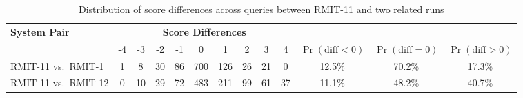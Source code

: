\begin{table*}[t]
  \centering
  \caption{Distribution of score differences across queries between RMIT-11 and two related runs}
  \label{tbl:scorediff}
  \begin{tabular}{lcccccccccccc}
    \toprule
    \bf System Pair & \multicolumn{9}{c}{\bf Score Differences} \\
    & -4 & -3 & -2 & -1 & 0 & 1 & 2 & 3 & 4 & $\Pr(\text{diff} < 0)$ & $\Pr(\text{diff} = 0)$ & $\Pr(\text{diff} > 0)$ \\
    \midrule
    RMIT-11 vs.\ RMIT-1  & 1 & 8 & 30 & 86 & 700 & 126 & 26 & 21 & 0 & 12.5\% & 70.2\% & 17.3\% \\
    RMIT-11 vs.\ RMIT-12 & 0 & 10 & 29 & 72 & 483 & 211 & 99 & 61 & 37 & 11.1\% & 48.2\% & 40.7\% \\
    \bottomrule
  \end{tabular}
\end{table*}

